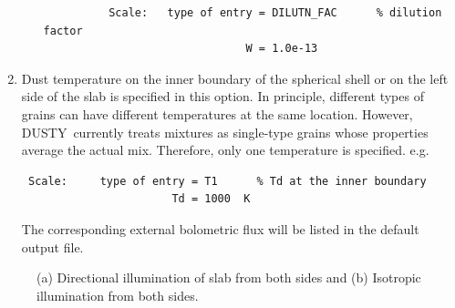 \documentclass[11pt]{article}
\def\D  {{\sf DUSTY}}
\begin{document}
\begin{enumerate}
\begin{itemize}
\begin{verbatim}
          Scale:   type of entry = DILUTN_FAC      % dilution factor
                               W = 1.0e-13
\end{verbatim}
\end{itemize}
%
\item
Dust temperature on the inner boundary of the spherical shell or on the left side of the slab
is specified in this option. In principle, different types of grains can have different
temperatures at the same location. However, \D\ currently treats mixtures as single-type grains
whose properties average the actual mix. Therefore, only one temperature is specified. e.g.
\begin{verbatim}
 Scale:     type of entry = T1      % Td at the inner boundary
                       Td = 1000  K
\end{verbatim}
The corresponding external bolometric flux will be listed in the default output file.
\end{enumerate}


\begin{figure}[hbtp]
   \centering
         \hspace{1.5cm}
\caption{(a) Directional illumination of slab from both sides and 
(b) Isotropic illumination from both sides.}
\label{impact parameter}
\end{figure}
\end{document}
